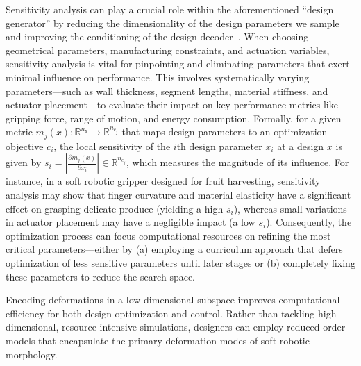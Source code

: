 Sensitivity analysis can play a crucial role within the aforementioned “design generator” by reducing the dimensionality of the design parameters we sample and improving the conditioning of the design decoder~\citep{chen2020design, guan2023trimmed, navez2024contributions}. When choosing geometrical parameters, manufacturing constraints, and actuation variables, sensitivity analysis is vital for pinpointing and eliminating parameters that exert minimal influence on performance. This involves systematically varying parameters—such as wall thickness, segment lengths, material stiffness, and actuator placement—to evaluate their impact on key performance metrics like gripping force, range of motion, and energy consumption. Formally, for a given metric $m_j(x): \mathbb{R}^{n_\mathrm{x}} \to \mathbb{R}^{n_{\mathrm{c}_j}}$ that maps design parameters to an optimization objective $c_i$, the local sensitivity of the $i$th design parameter $x_i$ at a design $x$ is given by $s_i = \left| \frac{\partial m_j(x)}{\partial x_i} \right| \in \mathbb{R}^{n_{\mathrm{c}_j}}$, which measures the magnitude of its influence. For instance, in a soft robotic gripper designed for fruit harvesting, sensitivity analysis may show that finger curvature and material elasticity have a significant effect on grasping delicate produce (yielding a high $s_i$), whereas small variations in actuator placement may have a negligible impact (a low $s_i$). Consequently, the optimization process can focus computational resources on refining the most critical parameters—either by (a) employing a curriculum approach that defers optimization of less sensitive parameters until later stages or (b) completely fixing these parameters to reduce the search space.

Encoding deformations in a low-dimensional subspace improves computational efficiency for both design optimization and control. Rather than tackling high-dimensional, resource-intensive simulations, designers can employ reduced-order models that encapsulate the primary deformation modes of soft robotic morphology.